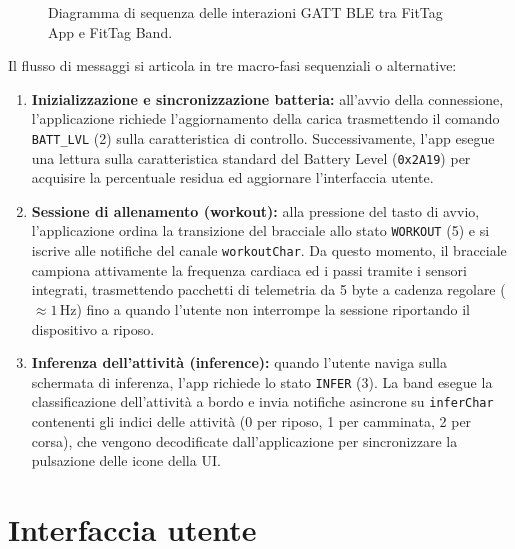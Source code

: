 \begin{figure}[ht]
    \caption{Diagramma di sequenza delle interazioni GATT BLE tra FitTag App e FitTag Band.}
    \label{fig:diagramma_sequenza}
\end{figure}

Il flusso di messaggi si articola in tre macro-fasi sequenziali o alternative:
\begin{enumerate}
    \item \textbf{Inizializzazione e sincronizzazione batteria:} all'avvio della connessione, l'applicazione richiede l'aggiornamento della carica trasmettendo il comando \texttt{BATT\_LVL} (2) sulla caratteristica di controllo. Successivamente, l'app esegue una lettura sulla caratteristica standard del Battery Level (\texttt{0x2A19}) per acquisire la percentuale residua ed aggiornare l'interfaccia utente.
    \item \textbf{Sessione di allenamento (workout):} alla pressione del tasto di avvio, l'applicazione ordina la transizione del bracciale allo stato \texttt{WORKOUT} (5) e si iscrive alle notifiche del canale \texttt{workoutChar}. Da questo momento, il bracciale campiona attivamente la frequenza cardiaca ed i passi tramite i sensori integrati, trasmettendo pacchetti di telemetria da 5 byte a cadenza regolare ($\approx 1\,\text{Hz}$) fino a quando l'utente non interrompe la sessione riportando il dispositivo a riposo.
    \item \textbf{Inferenza dell'attività (inference):} quando l'utente naviga sulla schermata di inferenza, l'app richiede lo stato \texttt{INFER} (3). La band esegue la classificazione dell'attività a bordo e invia notifiche asincrone su \texttt{inferChar} contenenti gli indici delle attività (0 per riposo, 1 per camminata, 2 per corsa), che vengono decodificate dall'applicazione per sincronizzare la pulsazione delle icone della UI.
\end{enumerate}

\section{Interfaccia utente}

